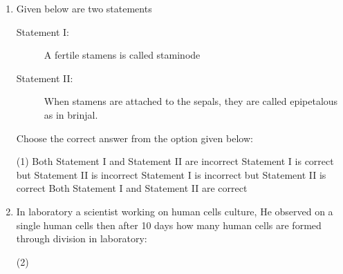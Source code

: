 \documentclass[twocolumn]{article}
\begin{document}
\begin{enumerate}
    \item Given below are two statements
    \begin{description}
        \item[Statement I:] A fertile stamens is called staminode
        \item[Statement II:] When stamens are attached to the sepals, they are called epipetalous as in brinjal.
    \end{description}
    Choose the correct answer from the option given below:
    \begin{tasks}(1)
        \task Both Statement I and Statement II are incorrect
        \task Statement I is correct but Statement II is incorrect
        \task Statement I is incorrect but Statement II is correct
        \task Both Statement I and Statement II are correct
    \end{tasks}

    \item In laboratory a scientist working on human cells culture, He observed on a single human cells then after 10 days how many human cells are formed through division in laboratory:
    \begin{tasks}(2)
    \end{tasks}
\end{enumerate}
\end{document}
